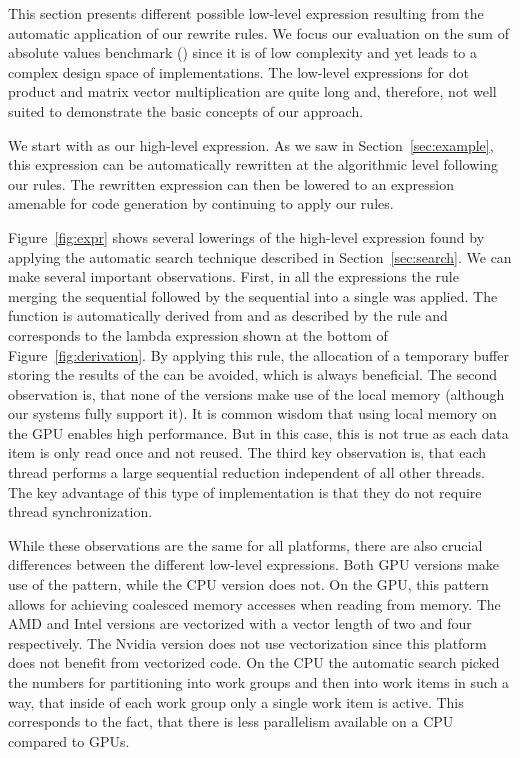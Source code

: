 \begin{figure*}[t]
\caption{Low-level expressions performing the sum of absolute values.
         These expressions are automatically derived by our system from the high-level expression $reduce(+, 0) \circ map(abs)$.
       }
\label{fig:expr}
\end{figure*}

This section presents different possible low-level expression resulting from the automatic application of our rewrite rules.
We focus our evaluation on the sum of absolute values benchmark () since it is of low complexity and yet leads to a complex design space of implementations.
The low-level expressions for dot product and matrix vector multiplication are quite long and, therefore, not well suited to demonstrate the basic concepts of our approach.

We start with  as our high-level expression.
As we saw in Section~\ref{sec:example}, this expression can be automatically rewritten at the algorithmic level following our rules.
The rewritten expression can then be lowered to an expression amenable for code generation by continuing to apply our rules.

Figure~\ref{fig:expr} shows several lowerings of the high-level expression found by applying the automatic search technique described in Section~\ref{sec:search}.
We can make several important observations.
First, in all the expressions the rule merging the sequential  followed by the sequential  into a single  was applied.
The function  is automatically derived from  and \pat{+} as described by the rule and corresponds to the lambda expression shown at the bottom of Figure~\ref{fig:derivation}.
By applying this rule, the allocation of a temporary buffer storing the results of the  can be avoided, which is always beneficial.
The second observation is, that none of the versions make use of the local memory (although our systems fully support it).
It is common wisdom that using local memory on the GPU enables high
performance.
But in this case, this is not true as each data item is only read once and not reused.
The third key observation is, that each thread performs a large sequential reduction independent of all other threads.
The key advantage of this type of implementation is that they do not require thread synchronization.

While these observations are the same for all platforms, there are also crucial differences between the different low-level expressions.
Both GPU versions make use of the  pattern, while the CPU version does not.
On the GPU, this pattern allows for achieving coalesced memory accesses when reading from memory.
The AMD and Intel versions are vectorized with a vector length of two and four respectively.
The Nvidia version does not use vectorization since this platform does not benefit from vectorized code.
On the CPU the automatic search picked the numbers for partitioning into work groups and then into work items in such a way, that inside of each work group only a single work item is active.
This corresponds to the fact, that there is less parallelism available on a CPU compared to GPUs.

